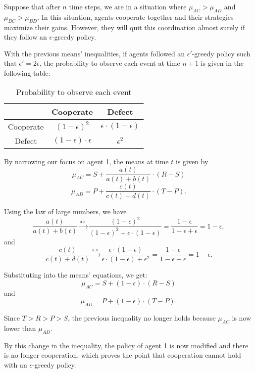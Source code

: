 \documentclass{article}
\theoremstyle{definition}
\begin{document}
Suppose that after \(n\) time steps, we are in a situation where \(\mu_{AC} > \mu_{AD}\) and \(\mu_{BC} > \mu_{BD}\). In this situation, agents cooperate together and their strategies maximize their gains. However, they will quit this coordination almost surely if they follow an \(\epsilon\)-greedy policy. 

With the previous means' inequalities, if agents followed an \(\epsilon'\)-greedy policy such that \(\epsilon'=2\epsilon\), the probability to observe each event at time \(n+1\) is given in the following table:

\begin{table}[h]
    \centering
    \begin{tabular}{c|cc}
       & Cooperate & Defect \\
      \hline
      Cooperate & \((1-\epsilon)^{2}\) & \(\epsilon \cdot(1-\epsilon)\) \\
      Defect    & \((1-\epsilon) \cdot \epsilon\) & \(\epsilon^{2}\) \\
    \end{tabular}
    \caption{Probability to observe each event}
    \label{tab:probability_events}
\end{table}

By narrowing our focus on agent 1, the means at time \(t\) is given by  
\[
\mu_{AC} = S+\frac{a(t)}{a(t)+b(t)} \cdot (R-S)
\]
\[
\mu_{AD} = P+\frac{c(t)}{c(t)+d(t)} \cdot (T-P).
\]

Using the law of large numbers, we have
\[
\frac{a(t)}{a(t)+b(t)} \xrightarrow{\text{a.s.}} \frac{(1-\epsilon)^{2}}{(1-\epsilon)^{2}+\epsilon \cdot (1-\epsilon)} = \frac{1-\epsilon}{1-\epsilon+\epsilon} = 1-\epsilon,
\]
and
\[
\frac{c(t)}{c(t)+d(t)} \xrightarrow{\text{a.s.}} \frac{\epsilon \cdot (1-\epsilon)}{\epsilon \cdot (1-\epsilon)+\epsilon^{2}} = \frac{1-\epsilon}{1-\epsilon+\epsilon} = 1-\epsilon.
\]

Substituting into the means' equations, we get:
\[
\mu_{AC}=S+(1-\epsilon) \cdot (R-S)
\]
and
\[
\mu_{AD}=P+(1-\epsilon) \cdot (T-P).
\]

Since \(T>R>P>S\), the previous inequality no longer holds because \(\mu_{AC}\) is now lower than \(\mu_{AD}\). 

By this change in the inequality, the policy of agent 1 is now modified and there is no longer cooperation, which proves the point that cooperation cannot hold with an \(\epsilon\)-greedy policy.
\end{document}

